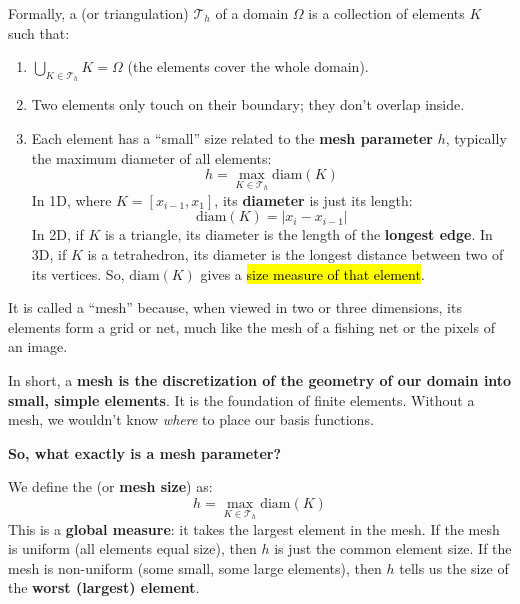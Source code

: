 \highspace
Formally, a  (or triangulation) $\mathcal{T}_{h}$ of a domain $\Omega$ is a collection of elements $K$ such that:
\begin{enumerate}
    \item $\displaystyle\bigcup_{K \in \mathcal{T}_{h}} K = \Omega$ (the elements cover the whole domain).
    \item Two elements only touch on their boundary; they don't overlap inside.
    \item Each element has a ``small'' size related to the \textbf{mesh parameter} $h$, typically the maximum diameter of all elements:
    \begin{equation*}
        h = \max_{K \in \mathcal{T}_{h}} \text{diam}\left(K\right)
    \end{equation*}
    In 1D, where $K = \left[x_{i-1}, x_{1}\right]$, its \textbf{diameter} is just its length:
    \begin{equation*}
        \text{diam}\left(K\right) = \left|x_{i} - x_{i-1}\right|
    \end{equation*}
    In 2D, if $K$ is a triangle, its diameter is the length of the \textbf{longest edge}. In 3D, if $K$ is a tetrahedron, its diameter is the longest distance between two of its vertices. So, $\text{diam}(K)$ gives a \hl{size measure of that element}.
\end{enumerate}
It is called a ``mesh'' because, when viewed in two or three dimensions, its elements form a grid or net, much like the mesh of a fishing net or the pixels of an image.

\highspace
In short, a \textbf{mesh is the discretization of the geometry of our domain into small, simple elements}. It is the foundation of finite elements. Without a mesh, we wouldn't know \emph{where} to place our basis functions.

\highspace
\begin{flushleft}
    \textcolor{Green3}{ \textbf{So, what exactly is a mesh parameter?}}
\end{flushleft}
We define the  (or \textbf{mesh size}) as:
\begin{equation}
    h = \max_{K \in \mathcal{T}_h} \text{diam}(K)
\end{equation}
This is a \textbf{global measure}: it takes the largest element in the mesh. If the mesh is uniform (all elements equal size), then $h$ is just the common element size. If the mesh is non-uniform (some small, some large elements), then $h$ tells us the size of the \textbf{worst (largest) element}.

